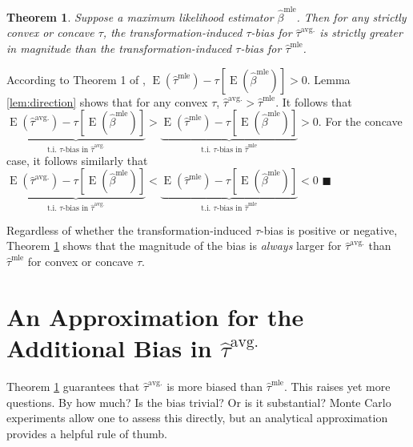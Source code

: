 \documentclass[10pt]{article}
\newtheorem{theorem}{Theorem}
\newenvironment{proof}[1][Proof]{\begin{trivlist}
\item[\hskip \labelsep {\bfseries #1}]}{\end{trivlist}}
\DeclareMathOperator*{\E}{\text{E}}
\begin{document}
\begin{theorem}\label{thm:direction}
Suppose a maximum likelihood estimator $\hat{\beta}^\text{mle}$. Then for any strictly convex or concave $\tau$, the transformation-induced $\tau$-bias for $\hat{\tau}^{\text{avg.}}$ is strictly greater in magnitude than the transformation-induced $\tau$-bias for $\hat{\tau}^{\text{mle}}$.
\end{theorem} 
\begin{proof}
According to Theorem 1 of \citet[p. 405]{Rainey2017}, $\E \left( \hat{\tau}^\text{mle}\right) -  \tau \left[\E \left( \hat{\beta}^\text{mle} \right) \right] > 0$.
Lemma \ref{lem:direction} shows that for any convex $\tau$, $\hat{\tau}^{\text{avg.}} > \hat{\tau}^\text{mle}$. It follows that $\underbrace{\E \left( \hat{\tau}^\text{avg.}\right) - \tau \left[\E \left( \hat{\beta}^\text{mle} \right) \right]}_{\text{t.i. } \tau\text{-bias in }\hat{\tau}^{\text{avg.}}} > \underbrace{\E \left( \hat{\tau}^\text{mle}\right) -  \tau \left[\E \left( \hat{\beta}^\text{mle} \right) \right]}_{\text{t.i. } \tau\text{-bias in }\hat{\tau}^{\text{mle}}} > 0$. For the concave case, it follows similarly that $\underbrace{\E \left( \hat{\tau}^\text{avg.}\right) - \tau \left[\E \left( \hat{\beta}^\text{mle} \right) \right]}_{\text{t.i. } \tau\text{-bias in }\hat{\tau}^{\text{avg.}}} < \underbrace{\E \left( \hat{\tau}^\text{mle}\right) -  \tau \left[\E \left( \hat{\beta}^\text{mle} \right) \right]}_{\text{t.i. } \tau\text{-bias in }\hat{\tau}^{\text{mle}}} < 0$
 $\blacksquare$
\end{proof}
Regardless of whether the transformation-induced $\tau$-bias is positive or negative, Theorem \ref{thm:direction} shows that the magnitude of the bias is \textit{always} larger for $\hat{\tau}^{\text{avg.}}$ than $\hat{\tau}^{\text{mle}}$ for convex or concave $\tau$.

\section*{An Approximation for the Additional Bias in $\hat{\tau}^\text{avg.}$}

Theorem \ref{thm:direction} guarantees that $\hat{\tau}^\text{avg.}$ is more biased than $\hat{\tau}^\text{mle}$. This raises yet more questions. By how much? Is the bias trivial? Or is it substantial? Monte Carlo experiments allow one to assess this directly, but an analytical approximation provides a helpful rule of thumb.
\end{document}
